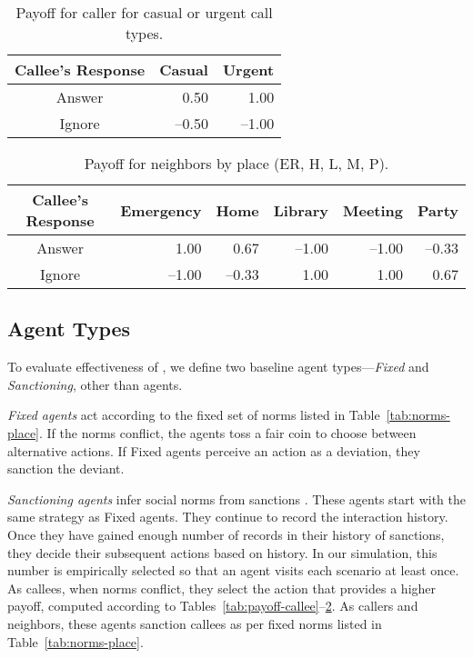 \begin{table}[!tb]
\centering

\caption[Payoff for caller]{Payoff for caller for casual or urgent call types.}
\label{tab:payoff-caller}

\begin{tabular}{@{}crr@{}}
\toprule
Callee's Response & Casual & Urgent\\\midrule
Answer&0.50&1.00\\
Ignore&--0.50&--1.00\\\bottomrule
\end{tabular}

\end{table}

\begin{table}[!tb]
\centering

\caption[Payoff for neighbors]{Payoff for neighbors by place (ER, H, L, M, P).} 
\label{tab:payoff-neighbor}

\begin{tabular}{@{}crrrrr@{}}
\toprule

Callee's Response & Emergency & Home & Library & Meeting & Party \\\midrule
Answer & 1.00 & 0.67 & --1.00 & --1.00 & --0.33\\
Ignore & --1.00 & --0.33 & 1.00 & 1.00 & 0.67\\\bottomrule

\end{tabular}

\end{table}

\subsection{Agent Types}
\label{sec:agent-types}

To evaluate effectiveness of \frameworkB, we define two baseline agent types---\emph{Fixed} and \emph{Sanctioning}, other than \frameworkB agents.

\emph{Fixed agents} act according to the fixed set of norms listed in
Table~\ref{tab:norms-place}. If the norms conflict, the agents toss a
fair coin to choose between alternative actions. If Fixed agents
perceive an action as a deviation, they sanction the deviant.

\emph{Sanctioning agents} infer social norms from sanctions
\citep{Andrighetto-2013-PunishVoice}. These
agents start with the same strategy as Fixed agents. They continue to record 
the interaction history. Once they have gained enough number of records in their
history of sanctions, they decide their subsequent actions based on
history. In our simulation, this number is empirically selected so that an
agent visits each scenario at least once. As callees,
when norms conflict, they select the action that provides a higher payoff, computed according to Tables~\ref{tab:payoff-callee}--\ref{tab:payoff-neighbor}. As callers
and neighbors, these agents sanction callees as per fixed norms listed
in Table~\ref{tab:norms-place}.

